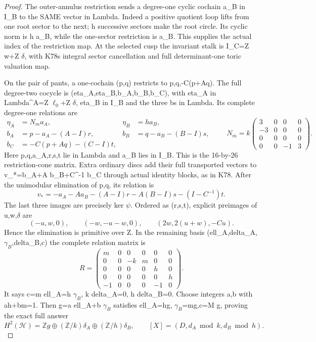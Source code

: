 \begin{proof}
The outer-annulus restriction sends a degree-one cyclic cochain a\_B in
I\_B to the SAME vector in Lambda. Indeed a positive quotient loop lifts
from one root sector to the next; h successive sectors make the root
circle. Its cyclic norm is h a\_B, while the one-sector restriction is
a\_B. This supplies the actual index of the restriction map. At the
selected cusp the invariant stalk is I\_C=Z w+Z \(\delta\), with K78\textquotesingle s integral
sector cancellation and full determinant-one toric valuation map.

On the pair of pants, a one-cochain (p,q) restricts to p,q,-C(p+Aq).
The full degree-two cocycle is (eta\_A,eta\_B,b\_A,b\_B,b\_C), with eta\_A in
Lambda\^{}A=Z \(\ell_0\)+Z \(\delta\), eta\_B in I\_B and the three b\textquotesingle s in Lambda.
Its complete degree-one relations are
\[
\begin{aligned}
\eta_A&=N_m a_A,&\eta_B&=h a_B,\\
b_A&=p-a_A-(A-I)r,&b_B&=q-a_B-(B-I)s,\\
b_C&=-C(p+Aq)-(C-I)t,
\end{aligned}\qquad
N_m=k\begin{pmatrix}3&0&0&0\\-3&0&0&0\\0&0&0&0\\0&0&-1&3\end{pmatrix}.
\tag{RE.4}
\]
Here p,q,a\_A,r,s,t lie in Lambda and a\_B lies in I\_B. This is the
16-by-26 restriction-cone matrix. Extra ordinary discs add their full
transported vectors to v\_*=b\_A+A b\_B+C\^{}-1 b\_C through actual identity
blocks, as in K78. After the unimodular elimination of p,q, its relation is
\[
v_*=-a_A-Aa_B-(A-I)r-A(B-I)s-(I-C^{-1})t.\tag{RE.5}
\]
The last three images are precisely ker \(\psi\). Ordered as (r,s,t), explicit
preimages of u,w,\(\delta\) are
\[
(-u,w,0),\qquad(-w,-u-w,0),\qquad(2w,2(u+w),-Cu).\tag{RE.6}
\]
Hence the elimination is primitive over Z. In the remaining basis
(ell\_A,delta\_A,\(\gamma_B\),delta\_B,c) the complete relation matrix is
\[
R=\begin{pmatrix}m&0&0&0&0&0\\0&0&-k&m&0&0\\0&0&0&0&h&0\\
0&0&0&0&0&h\\-1&0&0&0&-1&0\end{pmatrix}.\tag{RE.7}
\]
It says c=m ell\_A=h \(\gamma_B\), k delta\_A=0, h delta\_B=0. Choose integers
a,b with ah+bm=1. Then g=a ell\_A+b \(\gamma_B\) satisfies ell\_A=hg,
\(\gamma_B\)=mg,c=M g, proving the exact full answer
\[
H^2(\mathcal H)=\mathbb Zg\oplus(\mathbb Z/k)\delta_A
 \oplus(\mathbb Z/h)\delta_B,\qquad
[X]=(D,d_A\bmod k,d_B\bmod h).\tag{RE.8}
\]


\end{proof}
